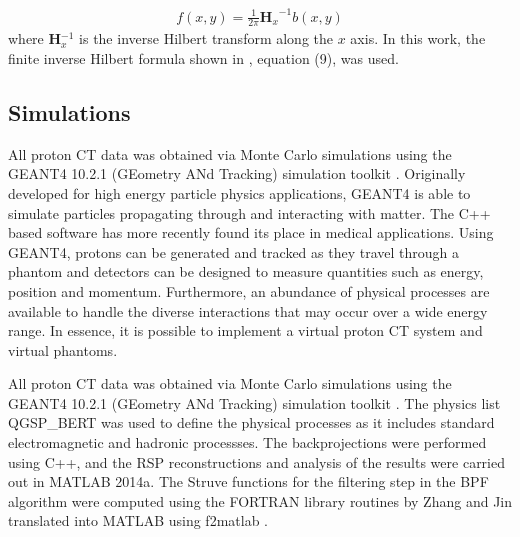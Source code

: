 \documentclass[11pt,a4paper]{article}
\begin{document}
\begin{eqnarray}
f(x,y) = \frac{1}{2\pi} \textbf{H$_{x}$}^{-1} b(x,y)
\end{eqnarray}
where \textbf{H$^{-1}_x$} is the inverse Hilbert transform along the $x$ axis. In this work, the finite inverse Hilbert formula shown in \parencite{zeng2007two}, equation (9), was used. %

\subsection{Simulations}
\label{sec:simulations}
All proton CT data was obtained via Monte Carlo simulations using the GEANT4 10.2.1 (GEometry ANd Tracking) simulation toolkit \parencite{agostinelli2003geant4}. Originally developed for high energy particle physics applications, GEANT4 is able to simulate particles propagating through and interacting with matter. The C++ based software has more recently found its place in medical applications. Using GEANT4, protons can be generated and tracked as they travel through a phantom and detectors can be designed to measure quantities such as energy, position and momentum. Furthermore, an abundance of physical processes are available to handle the diverse interactions that may occur over a wide energy range. In essence, it is possible to implement a virtual proton CT system and virtual phantoms. 

All proton CT data was obtained via Monte Carlo simulations using the GEANT4 10.2.1 (GEometry ANd Tracking) simulation toolkit \parencite{agostinelli2003geant4}. The physics list QGSP\_BERT was used to define the physical processes as it includes standard electromagnetic and hadronic processses. The backprojections were performed using C++, and the RSP reconstructions and analysis of the results were carried out in MATLAB 2014a. The Struve functions for the filtering step in the BPF algorithm were computed using the FORTRAN library routines by Zhang and Jin \parencite{zhang16computation} translated into MATLAB using f2matlab \parencite{f2matlab}.
\end{document}
